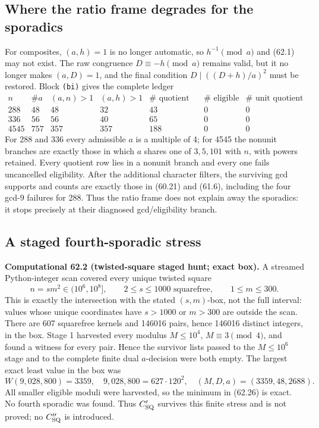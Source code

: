 \documentclass[10pt,reqno]{amsart}
\theoremstyle{definition}
\newcommand{\1}{\mathbf 1}
\begin{document}
\subsection{Where the ratio frame degrades for the sporadics}
For composites, $(a,h)=1$ is no longer automatic, so $h^{-1}\pmod a$ and
(62.1) may not exist.  The raw congruence $D\equiv-h\pmod a$ remains valid,
but it no longer makes $(a,D)=1$, and the final condition
$D\mid((D+h)/a)^2$ must be restored.  Block \texttt{(bi)} gives the
complete ledger
\begin{equation}\tag{62.24}
\begin{array}{r|r|r|r|r|r|r}
n&\#a&(a,n)>1&(a,h)>1&\#\text{ quotient rows}&
 \#\text{ eligible}&\#\text{ unit quotient rows}\\ \hline
288&48&48&32&43&0&0\\
336&56&56&40&65&0&0\\
4545&757&357&357&188&0&0
\end{array}
\end{equation}
For 288 and 336 every admissible $a$ is a multiple of 4; for 4545 the
nonunit branches are exactly those in which $a$ shares one of $3,5,101$
with $n$, with powers retained.  Every quotient row lies in a nonunit
branch and every one fails uncancelled eligibility.  After the additional
character filters, the surviving gcd supports and counts are exactly those
in (60.21) and (61.6), including the four gcd-$9$ failures for 288.  Thus
the ratio frame does not explain away the sporadics: it stops precisely at
their diagnosed gcd/eligibility branch.

\subsection{A staged fourth-sporadic stress}
\medskip\noindent\textbf{Computational 62.2 (twisted-square staged hunt;
exact box).}
A streamed Python-integer scan covered every unique twisted square
\begin{equation}\tag{62.25}
 n=sm^2\in(10^6,10^8],\qquad 2\leq s\leq1000\text{ squarefree},
                    \qquad1\leq m\leq300.
\end{equation}
This is exactly the intersection with the stated $(s,m)$-box, not the full
interval: values whose unique coordinates have $s>1000$ or $m>300$ are
outside the scan.  There are 607 squarefree kernels and 146016 pairs, hence
146016 distinct integers, in the box.  Stage 1 harvested every modulus
$M\leq10^4$, $M\equiv3\pmod4$, and found a witness for every pair.  Hence
the survivor lists passed to the $M\leq10^6$ stage and to the complete
finite dual $a$-decision were both empty.  The largest exact least value in
the box was
\begin{equation}\tag{62.26}
 W(9{,}028{,}800)=3359,
 \quad 9{,}028{,}800=627\cdot120^2,
 \quad (M,D,a)=(3359,48,2688).
\end{equation}
All smaller eligible moduli were harvested, so the minimum in (62.26) is
exact.  No fourth sporadic was found.  Thus $C_{\rm SQ}'$ survives this
finite stress and is not proved; no $C_{\rm SQ}''$ is introduced.
\end{document}
